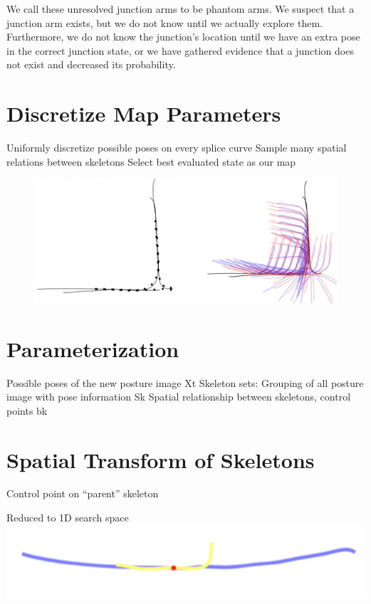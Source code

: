 We call these unresolved junction arms to be phantom arms. We suspect that a junction arm exists, but we do not know until we actually explore them. Furthermore, we do not know the junction's location until we have an extra pose in the correct junction state, or we have gathered evidence that a junction does not exist and decreased its probability.

\section{Discretize Map Parameters}
\label{discretizemapparameters}

Uniformly discretize possible poses on every splice curve
Sample many spatial relations between skeletons
Select best evaluated state as our map

\begin{figure}[htbp]
\centering
\includegraphics[keepaspectratio,width=\textwidth,height=0.75\textheight]{PastedGraphic8.pdf}
\label{pastedgraphic8.pdf}
\end{figure}



\section{Parameterization}
\label{parameterization}

Possible poses of the new posture image Xt
Skeleton sets: Grouping of all posture image with pose information Sk
Spatial relationship between skeletons, control points bk

\section{Spatial Transform of Skeletons}
\label{spatialtransformofskeletons}

Control point on “parent” skeleton

Reduced to 1D search space
\includegraphics[keepaspectratio,width=\textwidth,height=0.75\textheight]{PastedGraphic7.pdf}


